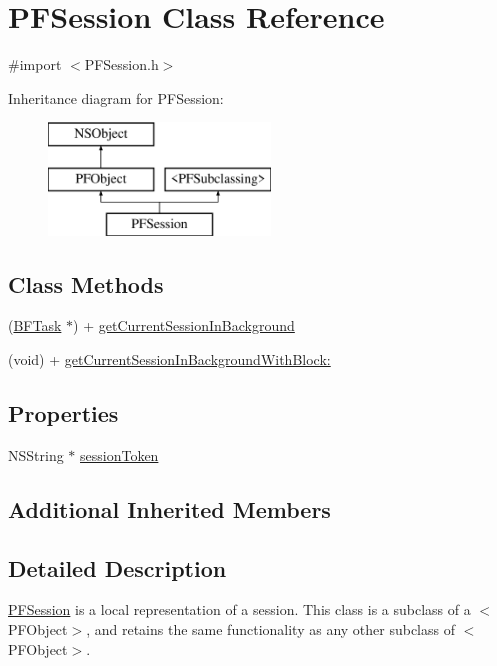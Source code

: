 \hypertarget{interface_p_f_session}{}\section{P\+F\+Session Class Reference}
\label{interface_p_f_session}


{\ttfamily \#import $<$P\+F\+Session.\+h$>$}

Inheritance diagram for P\+F\+Session\+:\begin{figure}[H]
\begin{center}
\leavevmode
\includegraphics[height=3.000000cm]{interface_p_f_session}
\end{center}
\end{figure}
\subsection*{Class Methods}
\begin{DoxyCompactItemize}
\item 
(\hyperlink{interface_b_f_task}{B\+F\+Task} $\ast$) + \hyperlink{interface_p_f_session_aedc9db93f901c4fc11416ebc4b746bf6}{get\+Current\+Session\+In\+Background}
\item 
(void) + \hyperlink{interface_p_f_session_a16bd2d5f71f28b5e73ac9b56686dbc2e}{get\+Current\+Session\+In\+Background\+With\+Block\+:}
\end{DoxyCompactItemize}
\subsection*{Properties}
\begin{DoxyCompactItemize}
\item 
N\+S\+String $\ast$ \hyperlink{interface_p_f_session_a9e2e9da02a395f3b549cc0cca89e3baa}{session\+Token}
\end{DoxyCompactItemize}
\subsection*{Additional Inherited Members}


\subsection{Detailed Description}
{\ttfamily \hyperlink{interface_p_f_session}{P\+F\+Session}} is a local representation of a session. This class is a subclass of a $<$\+P\+F\+Object$>$, and retains the same functionality as any other subclass of $<$\+P\+F\+Object$>$. 

